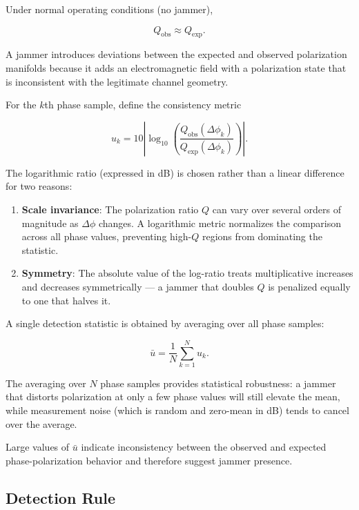 \documentclass{article}
\begin{document}
Under normal operating conditions (no jammer),

\begin{equation}
Q_{\mathrm{obs}}
\approx
Q_{\mathrm{exp}}.
\end{equation}

A jammer introduces deviations between the expected and observed polarization manifolds because it adds an electromagnetic field with a polarization state that is inconsistent with the legitimate channel geometry.

For the $k$th phase sample, define the consistency metric

\begin{equation}
u_k=
10
\left|
\log_{10}
\left(
\frac
{Q_{\mathrm{obs}}(\Delta\phi_k)}
{Q_{\mathrm{exp}}(\Delta\phi_k)}
\right)
\right|.
\end{equation}

The logarithmic ratio (expressed in dB) is chosen rather than a linear difference for two reasons:
\begin{enumerate}
\item \textbf{Scale invariance}: The polarization ratio $Q$ can vary over several orders of magnitude as $\Delta\phi$ changes. A logarithmic metric normalizes the comparison across all phase values, preventing high-$Q$ regions from dominating the statistic.
\item \textbf{Symmetry}: The absolute value of the log-ratio treats multiplicative increases and decreases symmetrically — a jammer that doubles $Q$ is penalized equally to one that halves it.
\end{enumerate}

A single detection statistic is obtained by averaging over all phase samples:

\begin{equation}
\bar{u}=
\frac{1}{N}
\sum_{k=1}^{N}
u_k.
\end{equation}

The averaging over $N$ phase samples provides statistical robustness: a jammer that distorts polarization at only a few phase values will still elevate the mean, while measurement noise (which is random and zero-mean in dB) tends to cancel over the average.

Large values of $\bar{u}$ indicate inconsistency between the observed and expected phase-polarization behavior and therefore suggest jammer presence.

\subsection{Detection Rule}
\end{document}
